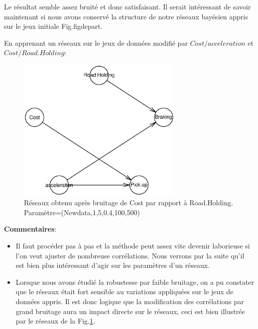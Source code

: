 \documentclass[a4paper]{article}
\begin{document}
Le résultat semble assez bruité et donc satisfaisant.
Il serait intéressant de savoir maintenant si nous avons conservé la structure de notre réseaux bayésien appris sur le jeux initiale Fig.{figdepart}.


En apprenant un  réseaux sur le jeux de données modifié par $Cost/acceleration$ et $Cost/Road.Holding$:


\begin{figure}[H] 
    \center 
    \includegraphics[width=8cm]{GRAPHE_FINAL_THIERRY.eps} 
    \caption{Réseaux obtenu après bruitage de Cost par rapport à Road.Holding. Paramètre=(Newdata,1,5,0.4,100,500)} 
\label{fig_network}
\end{figure} 


\textbf{Commentaires}:


\begin{itemize}
\item Il faut procéder pas à pas et la méthode peut assez vite devenir laborieuse si l'on veut ajuster de nombreuse corrélations. Nous verrons par la suite qu'il est bien plus intéressant d'agir sur les paramètres d'un réseaux. 


\item Lorsque nous avons étudié la robustesse par faible bruitage, on a pu constater que le réseaux était fort sensible au variations appliquées sur le jeux de données appris. Il est donc logique que la modification des corrélations par grand bruitage aura un impact directe sur le réseaux, ceci est bien  illustrée par le réseaux de la Fig.\ref{fig_network}.
\end{itemize}
\end{document}
